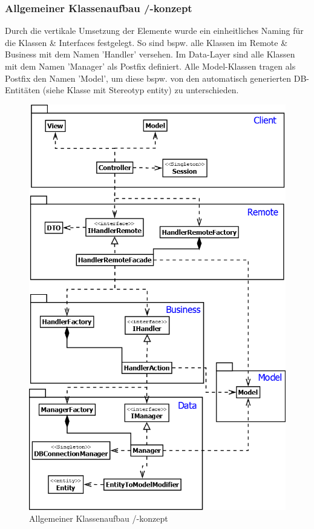 \clearpage
\subsubsection{Allgemeiner Klassenaufbau /-konzept}
Durch die vertikale Umsetzung der Elemente wurde ein einheitliches Naming für die Klassen \& Interfaces festgelegt. So sind bspw. alle Klassen im Remote \& Business mit dem Namen 'Handler' versehen. Im Data-Layer sind alle Klassen mit dem Namen 'Manager' als Postfix definiert. Alle Model-Klassen tragen als Postfix den Namen 'Model', um diese bspw. von den automatisch generierten DB-Entitäten (siehe Klasse mit Stereotyp entity) zu unterschieden.
\begin{figure}[H]
	\centering
	\includegraphics[width=0.65\linewidth]{Images/Class-Generic}
	\caption{Allgemeiner Klassenaufbau /-konzept}
	\label{fig:class-generic}
\end{figure}

